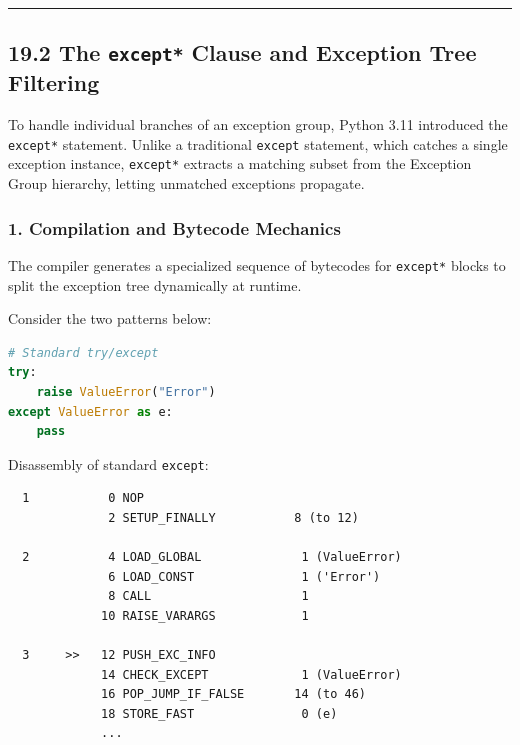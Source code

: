 \begin{center}\rule{0.5\linewidth}{0.5pt}\end{center}

\hypertarget{the-except-clause-and-exception-tree-filtering}{%
\subsection{\texorpdfstring{19.2 The \texttt{except*} Clause and
Exception Tree
Filtering}{19.2 The except* Clause and Exception Tree Filtering}}\label{the-except-clause-and-exception-tree-filtering}}

To handle individual branches of an exception group, Python 3.11
introduced the \passthrough{\lstinline!except*!} statement. Unlike a
traditional \passthrough{\lstinline!except!} statement, which catches a
single exception instance, \passthrough{\lstinline!except*!} extracts a
matching subset from the Exception Group hierarchy, letting unmatched
exceptions propagate.

\hypertarget{compilation-and-bytecode-mechanics}{%
\subsubsection{1. Compilation and Bytecode
Mechanics}\label{compilation-and-bytecode-mechanics}}

The compiler generates a specialized sequence of bytecodes for
\passthrough{\lstinline!except*!} blocks to split the exception tree
dynamically at runtime.

Consider the two patterns below:

\begin{lstlisting}[language=Python]
# Standard try/except
try:
    raise ValueError("Error")
except ValueError as e:
    pass
\end{lstlisting}

Disassembly of standard \passthrough{\lstinline!except!}:

\begin{lstlisting}
  1           0 NOP
              2 SETUP_FINALLY           8 (to 12)

  2           4 LOAD_GLOBAL              1 (ValueError)
              6 LOAD_CONST               1 ('Error')
              8 CALL                     1
             10 RAISE_VARARGS            1

  3     >>   12 PUSH_EXC_INFO
             14 CHECK_EXCEPT             1 (ValueError)
             16 POP_JUMP_IF_FALSE       14 (to 46)
             18 STORE_FAST               0 (e)
             ...
\end{lstlisting}

